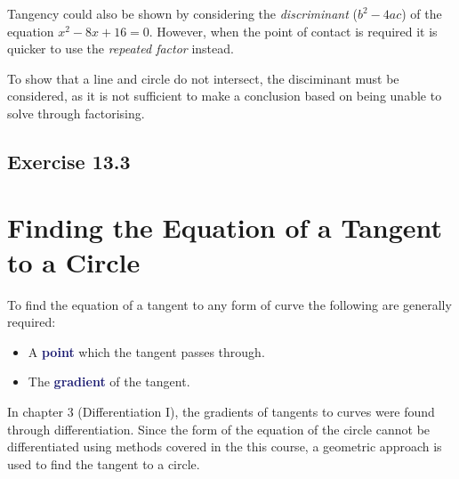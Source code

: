 \documentclass[
  11pt,
  openany]{book}
\begin{document}
Tangency could also be shown by considering the \emph{discriminant} (\(b^2-4ac\)) of the equation \(x^2-8x+16=0\). However, when the point of contact is required it is quicker to use the \emph{repeated factor} instead.

To show that a line and circle do not intersect, the disciminant must be considered, as it is not sufficient to make a conclusion based on being unable to solve through factorising.

\pagebreak

\subsection*{Exercise 13.3}\label{exercise-13.3}

\newpage

\section{Finding the Equation of a Tangent to a Circle}\label{finding-the-equation-of-a-tangent-to-a-circle}

\vspace{-0.5cm}

To find the equation of a tangent to any form of curve the following are generally required:

\vspace{-0.1cm}

\begin{itemize}
    \item A \textcolor{MidnightBlue}{\textbf{point}} which the tangent passes through.
    \item The \textcolor{MidnightBlue}{\textbf{gradient}} of the tangent.
\end{itemize}

\vspace{-0.1cm}

In chapter 3 (Differentiation I), the gradients of tangents to curves were found through differentiation. Since the form of the equation of the circle cannot be differentiated using methods covered in the this course, a geometric approach is used to find the tangent to a circle.

\vspace{-0.3cm}

\begin{center}
\end{center}
\end{document}
